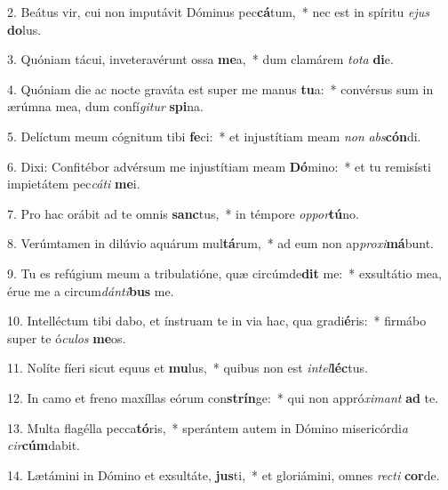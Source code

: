 2. Beátus vir, cui non imputávit Dóminus pec\textbf{cá}tum,~*  nec est in spíritu \textit{e}\textit{jus} \textbf{do}lus.\

3. Quóniam tácui, inveteravérunt ossa \textbf{me}a,~*  dum clamárem \textit{to}\textit{ta} \textbf{di}e.\

4. Quóniam die ac nocte graváta est super me manus \textbf{tu}a:~*  convérsus sum in ærúmna mea, dum confí\textit{gi}\textit{tur} \textbf{spi}na.\

5. Delíctum meum cógnitum tibi \textbf{fe}ci:~*  et injustítiam meam \textit{non} \textit{abs}\textbf{cón}di.\

6. Dixi: Confitébor advérsum me injustítiam meam \textbf{Dó}mino:~*  et tu remisísti impietátem pec\textit{cá}\textit{ti} \textbf{me}i.\

7. Pro hac orábit ad te omnis \textbf{sanc}tus,~*  in témpore \textit{op}\textit{por}\textbf{tú}no.\

8. Verúmtamen in dilúvio aquárum mul\textbf{tá}rum,~*  ad eum non ap\textit{pro}\textit{xi}\textbf{má}bunt.\

9. Tu es refúgium meum a tribulatióne, quæ circúmde\textbf{dit} me:~*  exsultátio mea, érue me a circum\textit{dán}\textit{ti}\textbf{bus} me.\

10. Intelléctum tibi dabo, et ínstruam te in via hac, qua gradi\textbf{é}ris:~*  firmábo super te ó\textit{cu}\textit{los} \textbf{me}os.\

11. Nolíte fíeri sicut equus et \textbf{mu}lus,~*  quibus non est \textit{in}\textit{tel}\textbf{léc}tus.\

12. In camo et freno maxíllas eórum con\textbf{strín}ge:~*  qui non appró\textit{xi}\textit{mant} \textbf{ad} te.\

13. Multa flagélla pecca\textbf{tó}ris,~*  sperántem autem in Dómino misericórdi\textit{a} \textit{cir}\textbf{cúm}dabit.\

14. Lætámini in Dómino et exsultáte, \textbf{jus}ti,~*  et gloriámini, omnes \textit{rec}\textit{ti} \textbf{cor}de.\

